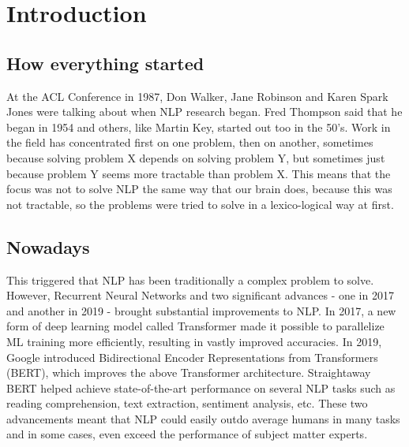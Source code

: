 \documentclass{article}
\title{\papertitle}
\begin{document}
%
\capstartfalse
\maketitle
\capstarttrue

\tableofcontents

%
\begin{abstract}
In this paper we introduce ourselves into the Natural Language Processing (NLP) world, and we discuss if it is possible to understand the functioning of the new discovered technics in NLP with our understanding on the functioning of our brain with its habitual processing of natural language. And in order to do it, it is used a variety of inputs like brain image records with some recent models in Deep Learning.
\end{abstract}
%

\section{Introduction}\label{sec:introduction}

\subsection{How everything started}
At the ACL Conference in 1987, Don Walker, Jane Robinson and Karen Spark Jones were talking about when NLP research began\cite{jones1994natural}. Fred Thompson said that he began in 1954 and others, like Martin Key, started out too in the 50's. Work in the field has concentrated first on one problem, then on another, sometimes because solving problem X depends on solving problem Y, but sometimes just because problem Y seems more tractable than problem X. This means that the focus was not to solve NLP the same way that our brain does, because this was not tractable, so the problems were tried to solve in a lexico-logical way at first. 
\subsection{Nowadays}
This triggered that NLP has been traditionally a complex problem to solve\cite{jones1992natural}. However, Recurrent Neural Networks and two significant advances - one in 2017 and another in 2019 - brought substantial improvements to NLP. In 2017, a new form of deep learning model called Transformer\cite{wang2019r} made it possible to parallelize ML training more efficiently, resulting in vastly improved accuracies.
In 2019, Google introduced Bidirectional Encoder Representations from Transformers (BERT)\cite{kamath2022bidirectional}, which improves the above Transformer architecture. Straightaway BERT helped achieve state-of-the-art performance\cite{DBLP:journals/corr/abs-1810-04805} on several NLP tasks such as reading comprehension, text extraction, sentiment analysis, etc. These two advancements meant that NLP could easily outdo average humans in many tasks and in some cases, even exceed the performance of subject matter experts. 
\end{document}
